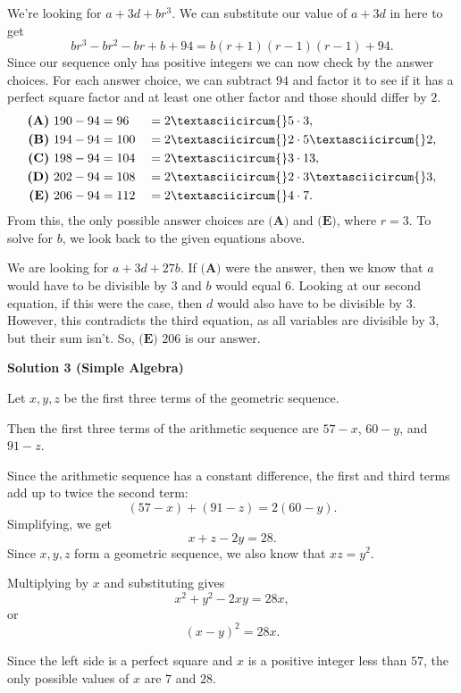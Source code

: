 \begin{enumerate}
 We're looking for $a+3d+br^3$. We can substitute our value of $a+3d$ in here to get 
 \[br^3-br^2-br+b+94=b(r+1)(r-1)(r-1)+94.\]Since our sequence only has positive integers we can now check by the answer choices. For each answer choice, we can subtract $94$ and factor it to see if it has a perfect square factor and at least one other factor and those should differ by $2$.
 \begin{alignat*}{8} \textbf{(A)} \ 190-94&=96&&=2\textasciicircum{}5\cdot3, \\ \textbf{(B)} \ 194-94&=100&&=2\textasciicircum{}2\cdot5\textasciicircum{}2, \\ \textbf{(C)} \ 198-94&=104&&=2\textasciicircum{}3\cdot13, \\ \textbf{(D)} \ 202-94&=108&&=2\textasciicircum{}2\cdot3\textasciicircum{}3, \\ \textbf{(E)} \ 206-94&=112&&=2\textasciicircum{}4\cdot7. \end{alignat*}From this, the only possible answer choices are $\textbf{(A)}$ and $\textbf{(E)}$, where $r=3$. To solve for $b$, we look back to the given equations above.

 We are looking for $a+3d+27b$. If $\textbf{(A)}$ were the answer, then we know that $a$ would have to be divisible by $3$ and $b$ would equal $6$. Looking at our second equation, if this were the case, then $d$ would also have to be divisible by $3$. However, this contradicts the third equation, as all variables are divisible by $3$, but their sum isn't. So, $\boxed{\textbf{(E) } 206}$ is our answer.

 


 


 



\textbf{Solution 3 (Simple Algebra)}

Let $x,y,z$ be the first three terms of the geometric sequence.

 Then the first three terms of the arithmetic sequence are $57-x$, $60-y$, and $91-z$.

 Since the arithmetic sequence has a constant difference, the first and third terms add up to twice the second term:
 \[(57-x)+(91-z)=2(60-y).\]Simplifying, we get
 \[x+z-2y=28.\]Since $x,y,z$ form a geometric sequence, we also know that $xz=y^2$.

 Multiplying by $x$ and substituting gives
 \[x^2+y^2-2xy=28x,\]or
 \[(x-y)^2=28x.\]

 Since the left side is a perfect square and $x$ is a positive integer less than $57$, the only possible values of $x$ are $7$ and $28$.


\end{enumerate}
